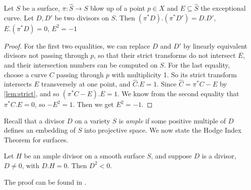 \begin{proposition}
    Let $S$ be a surface, $\pi\colon \hat{S} \to S$ blow up of a point $p \in X$ and $E \subseteq \hat{S}$ the exceptional curve. Let $D, D'$ be two divisors on $S$. Then $(\pi^*D).(\pi^*D') = D.D'$, $E.(\pi^*D) = 0$, $E^2 = -1$
\end{proposition}
\begin{proof}
    For the first two equalities, we can replace $D$ and $D'$ by linearly equivalent divisors not passing through $p$, so that their strict transforms do not intersect $E$, and their intersection numbers can be computed on $S$. For the last equality, choose a curve $C$ passing through $p$ with multiplicity 1. So its strict transform intersects $E$ transversely at one point, and $\hat{C}.E = 1$. Since $\hat{C} = \pi^*C - E$ by \cref{lem:strict}, and so $(\pi^*C - E).E = 1$. We know from the second equality that $\pi^*C.E = 0$, so $-E^2 = 1$. Then we get $E^2 = -1$.
\end{proof}


Recall that a divisor $D$ on a variety $S$ is \emph{ample} if some positive multiple of $D$ defines an embedding of $S$ into projective space. We now state the Hodge Index Theorem for surfaces.
\begin{theorem}\label{thm:hodge}
    Let $H$ be an ample divisor on a smooth surface $S$, and suppose $D$ is a divisor, $D \neq 0$, with $D.H = 0$. Then $D^2 < 0$.
\end{theorem}
The proof can be found in \cite[Theorem V.1.9]{Ha77}.